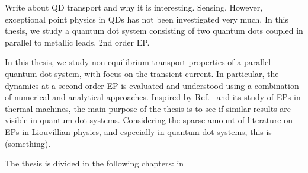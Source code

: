 \documentclass[../main.tex]{subfiles}
\begin{document}
Write about QD transport and why it is interesting. Sensing. However, exceptional point physics in QDs has not been investigated very much. In this thesis, we study a quantum dot system consisting of two quantum dots coupled in parallel to metallic leads. 2nd order EP.

In this thesis, we study non-equilibrium transport properties of a parallel quantum dot system, with focus on the transient current. In particular, the dynamics at a second order EP is evaluated and understood using a combination of numerical and analytical approaches. Inspired by Ref.~\cite{thermal} and its study of EPs in thermal machines, the main purpose of the thesis is to see if similar results are visible in quantum dot systems. Considering the sparse amount of literature on EPs in Liouvillian physics, and especially in quantum dot systems, this is (something).

The thesis is divided in the following chapters: in 
\end{document}
